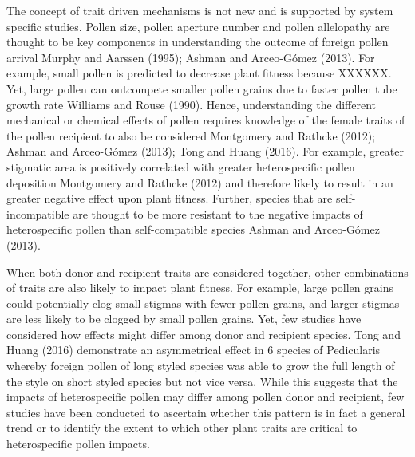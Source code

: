 \documentclass[11pt,a4paper]{article}
\begin{document}
The concept of trait driven mechanisms is not new and is supported by
system specific studies. Pollen size, pollen aperture number and pollen
allelopathy are thought to be key components in understanding the
outcome of foreign pollen arrival Murphy and Aarssen (1995); Ashman and
Arceo-Gómez (2013). For example, small pollen is predicted to decrease
plant fitness because XXXXXX. Yet, large pollen can outcompete smaller
pollen grains due to faster pollen tube growth rate Williams and Rouse
(1990). Hence, understanding the different mechanical or chemical
effects of pollen requires knowledge of the female traits of the pollen
recipient to also be considered Montgomery and Rathcke (2012); Ashman
and Arceo-Gómez (2013); Tong and Huang (2016). For example, greater
stigmatic area is positively correlated with greater heterospecific
pollen deposition Montgomery and Rathcke (2012) and therefore likely to
result in an greater negative effect upon plant fitness. Further,
species that are self-incompatible are thought to be more resistant to
the negative impacts of heterospecific pollen than self-compatible
species Ashman and Arceo-Gómez (2013).

When both donor and recipient traits are considered together, other
combinations of traits are also likely to impact plant fitness. For
example, large pollen grains could potentially clog small stigmas with
fewer pollen grains, and larger stigmas are less likely to be clogged by
small pollen grains. Yet, few studies have considered how effects might
differ among donor and recipient species. Tong and Huang (2016)
demonstrate an asymmetrical effect in 6 species of Pedicularis whereby
foreign pollen of long styled species was able to grow the full length
of the style on short styled species but not vice versa. While this
suggests that the impacts of heterospecific pollen may differ among
pollen donor and recipient, few studies have been conducted to ascertain
whether this pattern is in fact a general trend or to identify the
extent to which other plant traits are critical to heterospecific pollen
impacts.
\end{document}
